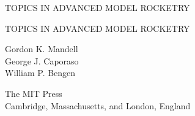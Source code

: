 
\clearpage
\thispagestyle{empty}
\label{front:1973}
\vspace*{0.25\textheight}
\begin{center}
  {\large TOPICS IN ADVANCED MODEL ROCKETRY\par}
\end{center}
\vspace*{\fill}

\clearpage
\thispagestyle{empty}
\vspace*{0.24\textheight}
\begin{center}
  {\Large TOPICS IN ADVANCED MODEL ROCKETRY\par}
  \vspace{2.5em}
  {\large Gordon K. Mandell\\[0.5em]
  George J. Caporaso\\[0.5em]
  William P. Bengen\par}
\end{center}
\vfill
\begin{center}
  {\large The MIT Press\\[0.5em]
  Cambridge, Massachusetts, and London, England\par}
\end{center}
\vspace*{0.16\textheight}

